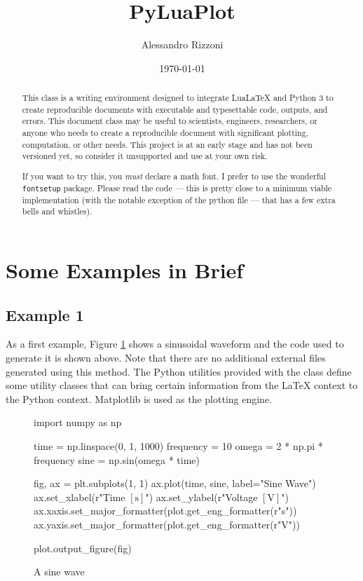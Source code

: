 \documentclass[10pt, twocolumn]{article}
\author{Alessandro Rizzoni}
\title{PyLuaPlot}
\date{\today}
\begin{document}
\maketitle

\begin{abstract}

  This class is a writing environment designed to integrate LuaLaTeX and Python
  3 to create reproducible documents with executable and typesettable code,
  outputs, and errors. This document class may be useful to scientists,
  engineers, researchers, or anyone who needs to create a reproducible document
  with significant plotting, computation, or other needs. This project is at an
  early stage and has not been versioned yet, so consider it unsupported and use
  at your own risk.

  If you want to try this, you \emph{must} declare a math font. I prefer to use
  the wonderful \texttt{fontsetup} package. Please read the code --- this is
  pretty close to a minimum viable implementation (with the notable exception of
  the python file --- that has a few extra bells and whistles).

\end{abstract}

\section{Some Examples in Brief}

\subsection{Example 1}

As a first example, Figure \ref{fig:sine} shows a sinusoidal waveform and the
code used to generate it is shown above. Note that there are no additional
external files generated using this method. The Python utilities provided with
the class define some utility classes that can bring certain information from
the LaTeX context to the Python context. Matplotlib is used as the plotting
engine.

\begin{figure}[!ht]
  \begin{pycode}
    import numpy as np

    time = np.linspace(0, 1, 1000)
    frequency = 10
    omega = 2 * np.pi * frequency
    sine = np.sin(omega * time)

    fig, ax = plt.subplots(1, 1)
    ax.plot(time, sine, label="Sine Wave")
    ax.set_xlabel(r"Time $\left[\mathrm{s}\right]$")
    ax.set_ylabel(r"Voltage $\left[\mathrm{V}\right]$")
    ax.xaxis.set_major_formatter(plot.get_eng_formatter(r"s"))
    ax.yaxis.set_major_formatter(plot.get_eng_formatter(r"V"))

    plot.output_figure(fig)
  \end{pycode}
  \caption{A sine wave}\label{fig:sine}
\end{figure}
\end{document}
